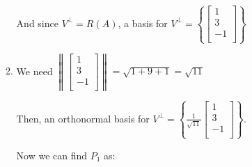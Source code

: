 \documentclass[12pt,letterpaper]{article}
\begin{document}
\begin{enumerate}
\begin{enumerate}
          And since $V^{\perp} = R(A)$,
          a basis for $V^{\perp} = \left\{\begin{bmatrix}1 \\ 3 \\ -1 \\\end{bmatrix}\right\}$
        \item
          We need $\left\|\begin{bmatrix}1 \\ 3 \\ -1 \\\end{bmatrix}\right\| = \sqrt{1 + 9 + 1} = \sqrt{11}$

          Then, an orthonormal basis for $V^{\perp} = \left\{\frac{1}{\sqrt{11}}\begin{bmatrix}1 \\ 3 \\ -1 \\\end{bmatrix}\right\}$.

          Now we can find $P_1$ as:


\end{enumerate}
\end{enumerate}
\end{document}
